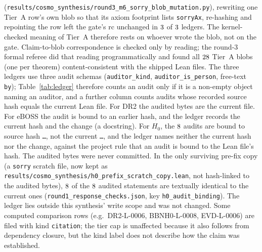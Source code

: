\documentclass[11pt]{article}
\begin{document}
(\texttt{results/cosmo\_synthesis/round3\_m6\_sorry\_blob\_mutation.py}), rewriting one Tier~A row's own blob so that its axiom footprint lists \texttt{sorryAx}, re-hashing and
repointing the row left the gate's rc unchanged in $3$ of $3$ ledgers. The kernel-checked meaning of Tier~A therefore rests on whoever wrote the blob, not on
the gate. Claim-to-blob correspondence is checked only by reading; the round-3 formal referee did that reading programmatically and found all $28$ Tier~A blobs (one per theorem)
content-consistent with the shipped Lean files. The three ledgers use three audit schemas (\texttt{auditor\_kind}, \texttt{auditor\_is\_person},
free-text \texttt{by}); Table~\ref{tab:ledger} therefore counts an audit only if it is a non-empty object naming an auditor, and a further column
counts audits whose recorded source hash equals the current Lean file. For DR2 the audited bytes are the current file. For eBOSS the audit is bound to
an earlier hash, and the ledger records the current hash and the change (a docstring). For $H_0$, the $8$ audits are bound to source hash
\texttt{\rbAuditSha\ldots}, not the current \texttt{\rbCurSha\ldots}, and the ledger names neither the current hash nor the change, against the
project rule that an audit is bound to the Lean file's hash. The audited bytes were never committed. In the only surviving pre-fix copy (a
\texttt{sorry} scratch file, now kept as \texttt{results/cosmo\_synthesis/h0\_prefix\_scratch\_copy.lean}, not hash-linked to the audited bytes), $8$ of the $8$ audited statements are textually identical to the current
ones (\texttt{round1\_response\_checks.json}, key \texttt{h0\_audit\_binding}). The ledger lies outside this synthesis' write scope and was not changed.
Some computed comparison rows (e.g.\ DR2-L-0006, BBNH0-L-0008, EVD-L-0006) are filed with kind \texttt{citation}; the tier cap is unaffected
because it also follows from dependency closure, but the kind label does not describe how the claim was established.
\end{document}
